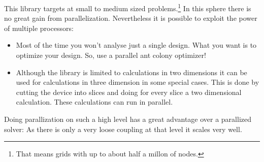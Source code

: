 This library targets at small to medium sized problems.\footnote{That
  means grids with up to about half a millon of nodes.} In this sphere
there is no great gain from parallelization.  Nevertheless it is
possible to exploit the power of multiple processors:
\begin{itemize}
\item Most of the time you won't analyse just a single design. What
  you want is to optimize your design.  So, use a parallel ant colony
  optimizer!
\item Although the library is limited to calculations in two
  dimensions it can be used for calculations in three dimension in
  some special cases.  This is done by cutting the device into slices
  and doing for every slice a two dimensional calculation.  These
  calculations can run in parallel.
\end{itemize}
Doing parallization on such a high level has a great advantage over a
parallized solver:  As there is only a very loose coupling at that
level it scales very well.



